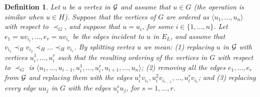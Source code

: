 \documentclass[11pt]{article}
\newtheorem{definition}[theorem]{Definition}
\begin{document}
\begin{definition}\label{def:splitting}
Let $u$ be a vertex in ${\cal G}$ and assume that $u \in G$ (the operation is similar when $u \in H$). Suppose that the vertices of $G$ are ordered as $\langle u_1, \ldots, u_n\rangle$ with respect to $\prec_G$, and suppose that $u=u_i$, for some $i \in \{1, \ldots, n\}$. Let $e_1=uv_{i_1}, \ldots, e_r=uv_{i_r}$ be the edges incident to $u$ in $E_L$, and assume that $v_{i_1} \prec_H v_{i_2} \prec_H \ldots \prec_H v_{i_r}$. By {\em splitting} vertex $u$ we mean: (1) replacing $u$ in ${\cal G}$ with vertices $u_{i}^{1}, \ldots, u_{i}^{r}$ such that the resulting ordering of the vertices in $G$ with respect to $\prec_G$ is $\langle u_1, \ldots, u_{i-1}, u_{i}^{1}, \ldots, u_{i}^{r}, u_{i+1}, \ldots, u_n\rangle$; (2) removing all the edges $e_1, \ldots, e_r$ from ${\cal G}$ and replacing them with the edges $u_{i}^{1}v_{i_r}, u_{i}^{2}v_{i_{r-1}}, \ldots, u_{i}^{r}v_{i_1}$; and (3) replacing every edge $uu_j$ in $G$ with the edges $u_{i}^{s}u_j$, for $s=1, \ldots, r$.
\end{definition}
\end{document}

